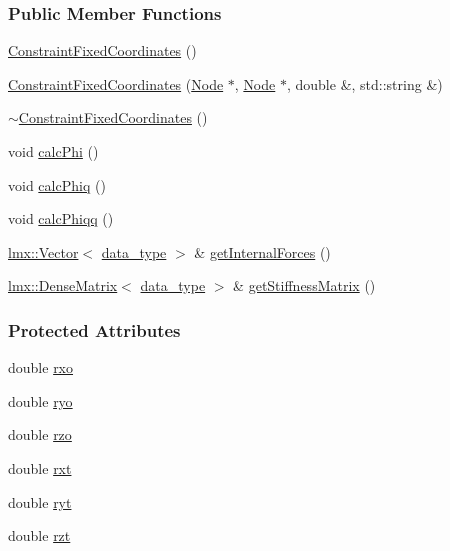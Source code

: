 \subsubsection*{Public Member Functions}
\begin{DoxyCompactItemize}
\item 
\hyperlink{classmknix_1_1_constraint_fixed_coordinates_aaa5e21e995ca95bb8dc45a411987fda2}{Constraint\+Fixed\+Coordinates} ()
\item 
\hyperlink{classmknix_1_1_constraint_fixed_coordinates_a0e45a40d38156a55c34380238d369592}{Constraint\+Fixed\+Coordinates} (\hyperlink{classmknix_1_1_node}{Node} $\ast$, \hyperlink{classmknix_1_1_node}{Node} $\ast$, double \&, std\+::string \&)
\item 
\hyperlink{classmknix_1_1_constraint_fixed_coordinates_ab8fcae0a6b615cbc81d1db67887c1a54}{$\sim$\+Constraint\+Fixed\+Coordinates} ()
\item 
void \hyperlink{classmknix_1_1_constraint_fixed_coordinates_ae549d41c12fcc094bdc32bc853ebbd84}{calc\+Phi} ()
\item 
void \hyperlink{classmknix_1_1_constraint_fixed_coordinates_a250813aed17ab80b03a9b6b7f4a7ce8b}{calc\+Phiq} ()
\item 
void \hyperlink{classmknix_1_1_constraint_fixed_coordinates_a80e20da8642dc3c35b7969f7c2c5affe}{calc\+Phiqq} ()
\item 
\hyperlink{classlmx_1_1_vector}{lmx\+::\+Vector}$<$ \hyperlink{namespacemknix_a16be4b246fbf2cceb141e3a179111020}{data\+\_\+type} $>$ \& \hyperlink{classmknix_1_1_constraint_fixed_coordinates_a24c5ba96ad8fcdba23d6fbeda1e87583}{get\+Internal\+Forces} ()
\item 
\hyperlink{classlmx_1_1_dense_matrix}{lmx\+::\+Dense\+Matrix}$<$ \hyperlink{namespacemknix_a16be4b246fbf2cceb141e3a179111020}{data\+\_\+type} $>$ \& \hyperlink{classmknix_1_1_constraint_fixed_coordinates_a85f3564f2109d0cdf09f99b1ff5eea24}{get\+Stiffness\+Matrix} ()
\end{DoxyCompactItemize}
\subsubsection*{Protected Attributes}
\begin{DoxyCompactItemize}
\item 
double \hyperlink{classmknix_1_1_constraint_fixed_coordinates_a07324acb35594ed9274bc8b79ca356c1}{rxo}
\item 
double \hyperlink{classmknix_1_1_constraint_fixed_coordinates_a1e5c7b99aad5c0c1752d3fa5154ff77e}{ryo}
\item 
double \hyperlink{classmknix_1_1_constraint_fixed_coordinates_a1e43b5f72d8064762f0427204f46b3a1}{rzo}
\item 
double \hyperlink{classmknix_1_1_constraint_fixed_coordinates_afb8e43d7544941154e51c93e0662ef93}{rxt}
\item 
double \hyperlink{classmknix_1_1_constraint_fixed_coordinates_ade68140fb4d4f9e0cb0d2996274e222a}{ryt}
\item 
double \hyperlink{classmknix_1_1_constraint_fixed_coordinates_a45657121be64f04cf1667a9090ba6451}{rzt}
\end{DoxyCompactItemize}


